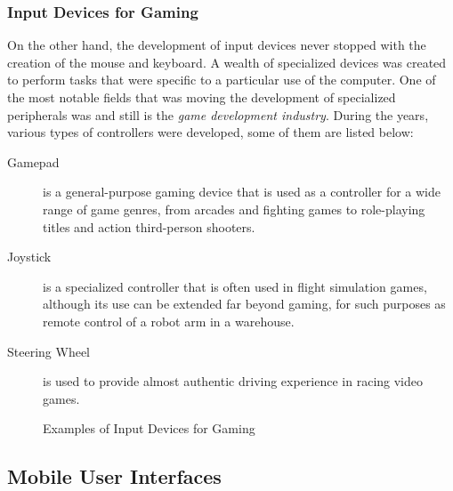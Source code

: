 \subsubsection{Input Devices for Gaming}

On the other hand, the development of input devices never stopped with the
creation of the mouse and keyboard. A wealth of specialized devices was
created to perform tasks that were specific to a particular use of the
computer. One of the most notable fields that was moving the development of
specialized peripherals was and still is the \emph{game development industry}.
During the years, various types of controllers were developed, some of them
are listed below:

\begin{description}

    \item [Gamepad] is a general-purpose gaming device that is used as a
        controller for a wide range of game genres, from arcades and fighting
        games to role-playing titles and action third-person shooters.

    \item [Joystick] is a specialized controller that is often used in flight
        simulation games, although its use can be extended far beyond gaming, for such
        purposes as remote control of a robot arm in a warehouse.

    \item [Steering Wheel] is used to provide almost authentic driving
        experience in racing video games.

\end{description}


\begin{figure}[!ht]
    \centering
    \caption{Examples of Input Devices for Gaming}
\end{figure}



\subsection{Mobile User Interfaces}

